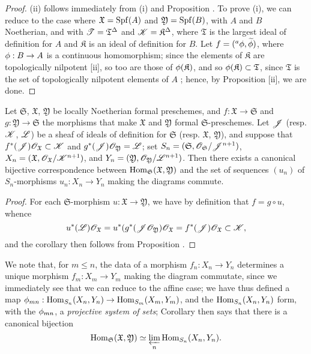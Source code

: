 \begin{proof}
\label{proof-1.10.6.10}
(ii) follows immediately from (i) and Proposition .
To prove (i), we can reduce to the case where $\mathfrak{X}=\operatorname{Spf}(A)$ and $\mathfrak{Y}=\operatorname{Spf}(B)$, with $A$ and $B$ Noetherian, and with $\mathscr{T}=\mathfrak{T}^\Delta$ and $\mathscr{K}=\mathfrak{K}^\Delta$, where $\mathfrak{T}$ is the largest ideal of definition for $A$ and $\mathfrak{K}$ is an ideal of definition for $B$.
Let $f=({}^a\phi,\widetilde{\phi})$, where $\vphi:B\to A$ is a continuous homomorphism; since the elements of $\mathfrak{K}$ are topologically nilpotent [ii], so too are those of $\phi(\mathfrak{K})$, and so $\phi(\mathfrak{K})\subset\mathfrak{T}$, since $\mathfrak{T}$ is the set of topologically nilpotent elements of $A$ ; hence, by Proposition [ii], we are done.
\end{proof}

\begin{corollary}[10.6.11]
\label{1.10.6.11}
Let $\mathfrak{S}$, $\mathfrak{X}$, $\mathfrak{Y}$ be locally Noetherian formal preschemes, and $f:\mathfrak{X}\to\mathfrak{S}$ and $g:\mathfrak{Y}\to\mathfrak{S}$ the morphisms that make $\mathfrak{X}$ and $\mathfrak{Y}$ formal $\mathfrak{S}$-preschemes.
Let $\mathscr{J}$ (resp. $\mathscr{K}$, $\mathscr{L}$) be a sheaf of ideals of definition for $\mathfrak{S}$ (resp. $\mathfrak{X}$, $\mathfrak{Y}$), and suppose that $f^*(\mathscr{J})\mathscr{O}_\mathfrak{X}\subset\mathscr{K}$ and $g^*(\mathscr{J})\mathscr{O}_\mathfrak{Y}=\mathscr{L}$; set $S_n=(\mathfrak{S},\mathscr{O}_\mathfrak{S}/\mathscr{J}^{n+1})$, $X_n=(\mathfrak{X},\mathscr{O}_\mathfrak{X}/\mathscr{K}^{n+1})$, and $Y_n=(\mathfrak{Y},\mathscr{O}_\mathfrak{Y}/\mathscr{L}^{n+1})$.
Then there exists a canonical bijective correspondence
between $\operatorname{Hom}_\mathfrak{S}(\mathfrak{X},\mathfrak{Y})$ and the set of sequences $(u_n)$ of $S_n$-morphisms $u_n:X_n\to Y_n$ making the diagrams  commute.
\end{corollary}

\begin{proof}
\label{proof-1.10.6.11}
For each $\mathfrak{S}$-morphism $u:\mathfrak{X}\to\mathfrak{Y}$, we have by definition that $f=g\circ u$, whence
\[
  u^*(\mathscr{L})\mathscr{O}_\mathfrak{X}=u^*(g^*(\mathscr{J}\mathscr{O}_\mathfrak{Y})\mathscr{O}_\mathfrak{X}=f^*(\mathscr{J})\mathscr{O}_\mathfrak{X}\subset\mathscr{K},
\]
and the corollary then follows from Proposition .
\end{proof}

We note that, for $m\leq n$, the data of a morphism $f_n:X_n\to Y_n$ determines a unique morphism $f_m:X_m\to Y_m$ making the diagram  commutate, since we immediately see that we can reduce to the affine case; we have thus defined a map $\vphi_{mn}:\Hom_{S_n}(X_n,Y_n)\to\Hom_{S_m}(X_m,Y_m)$, and the $\operatorname{Hom}_{S_n}(X_n,Y_n)$ form, with the $\phi_{mn}$, a \emph{projective system of sets}; Corollary  then says that there is a canonical bijection
\[
  \operatorname{Hom}_\mathfrak{S}(\mathfrak{X},\mathfrak{Y})\simeq\varprojlim_n\operatorname{Hom}_{S_n}(X_n,Y_n).
\]

